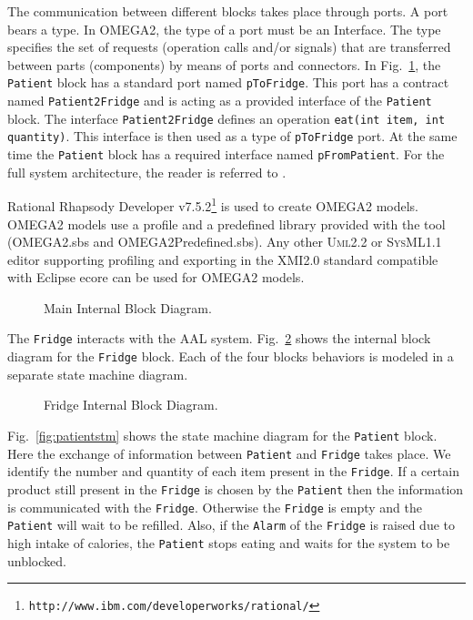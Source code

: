 \documentclass[a4paper,twoside]{article}
\def\sysml{\textsc{SysML}}
\def\uml{\textsc{Uml}}
\begin{document}
The communication between different blocks takes place through ports. A  port  bears  a  type.  In  OMEGA2,  the  type  of  a  port  must  be  an  Interface. The type specifies the set of requests (operation calls and/or signals) that  are transferred between parts (components) by means of ports and connectors. In Fig.~\ref{fig:mainibd}, the \texttt{Patient} block has a standard port named \texttt{pToFridge}. This port has a contract named \texttt{Patient2Fridge} and is acting as a provided interface of the \texttt{Patient} block. The interface \texttt{Patient2Fridge} defines an operation \texttt{eat(int item, int quantity)}. This interface is then used as a type of \texttt{pToFridge} port. At the same time the \texttt{Patient} block has a required interface named \texttt{pFromPatient}. For the full system architecture, the reader is referred to \cite{MAhmad2013}.

Rational Rhapsody Developer v7.5.2\footnote{\texttt{http://www.ibm.com/developerworks/rational/}} is used to create OMEGA2 models. OMEGA2 models use a profile and a predefined library provided with the tool (OMEGA2.sbs and OMEGA2Predefined.sbs). Any other \uml{}2.2 or \sysml{}1.1 editor supporting profiling and exporting in the XMI2.0 standard compatible with Eclipse ecore can be used for OMEGA2 models.

\begin{figure}[!h]
  \centering
  {}
  \caption{Main Internal Block Diagram.}
  \label{fig:mainibd}
 \end{figure}
 
The \texttt{Fridge} interacts with the AAL system. Fig.~\ref{fig:fridgeibd} shows the internal block diagram for the \texttt{Fridge} block. Each of the four blocks behaviors is modeled in a separate state machine diagram.

\begin{figure}[!h]
  \centering
  {}
  \caption{Fridge Internal Block Diagram.}
  \label{fig:fridgeibd}
 \end{figure}
 
Fig.~\ref{fig:patientstm} shows the state machine diagram for the \texttt{Patient} block. Here the exchange of information between \texttt{Patient} and \texttt{Fridge} takes place. We identify the number and quantity of each item present in the \texttt{Fridge}. If a certain product still present in the \texttt{Fridge} is chosen by the \texttt{Patient} then the information is  communicated with the \texttt{Fridge}.  Otherwise the \texttt{Fridge} is empty and the \texttt{Patient} will wait to be refilled. Also, if the \texttt{Alarm} of the \texttt{Fridge} is raised due to  high intake of calories, the \texttt{Patient} stops eating and waits for the system to be unblocked.
 
\end{document}
